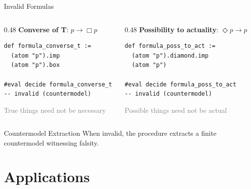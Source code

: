 \documentclass[aspectratio=169,11pt]{beamer}
\newcommand{\nec}{\Box}
\newcommand{\poss}{\Diamond}
\newcommand{\imp}{\rightarrow}
\begin{document}
\begin{frame}[fragile]{Invalid Formulas}

\begin{columns}
\begin{column}{0.48\textwidth}
\textbf{Converse of T}: $p \imp \nec p$
\begin{lstlisting}[basicstyle=\ttfamily\scriptsize]
def formula_converse_t :=
  (atom "p").imp
  (atom "p").box

#eval decide formula_converse_t
-- invalid (countermodel)
\end{lstlisting}
{\small\textcolor{gray}{True things need not be necessary}}
\end{column}
\begin{column}{0.48\textwidth}
\textbf{Possibility to actuality}: $\poss p \imp p$
\begin{lstlisting}[basicstyle=\ttfamily\scriptsize]
def formula_poss_to_act :=
  (atom "p").diamond.imp
  (atom "p")

#eval decide formula_poss_to_act
-- invalid (countermodel)
\end{lstlisting}
{\small\textcolor{gray}{Possible things need not be actual}}
\end{column}
\end{columns}

\vspace{0.5cm}

\begin{alertblock}{Countermodel Extraction}
When invalid, the procedure extracts a finite countermodel witnessing falsity.
\end{alertblock}

\end{frame}


\section{Applications}
\end{document}
